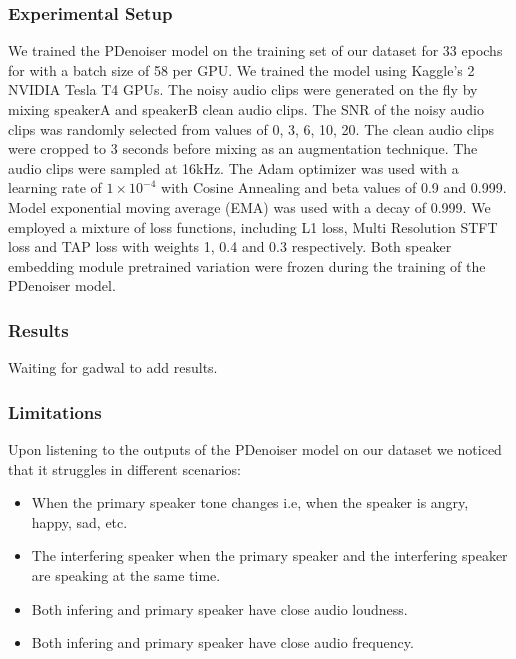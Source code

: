 \subsubsection{Experimental Setup}
We trained the PDenoiser model on the training set of our dataset for 33 epochs for  with a batch size of 58 per GPU. We trained the model using Kaggle's 2 NVIDIA Tesla T4 GPUs.
The noisy audio clips were generated on the fly by mixing speakerA and speakerB clean audio clips. The SNR of the noisy audio clips was randomly selected from values of 0, 3, 6, 10, 20.
The clean audio clips were cropped to 3 seconds before mixing as an augmentation technique. The audio clips were sampled at 16kHz.
The Adam optimizer was used with a learning rate of $1 \times 10^{-4}$ with Cosine Annealing and beta values of 0.9 and 0.999. Model exponential moving average (EMA) was used with a decay of 0.999.
We employed a mixture of loss functions, including L1 loss, Multi Resolution STFT loss and TAP loss with weights 1, 0.4 and 0.3 respectively.
Both speaker embedding module pretrained variation were frozen during the training of the PDenoiser model.

\subsubsection{Results}
Waiting for gadwal to add results.


\subsubsection{Limitations}
Upon listening to the outputs of the PDenoiser model on our dataset we noticed that it struggles in different scenarios:
\begin{itemize}
    \item When the primary speaker tone changes i.e, when the speaker is angry, happy, sad, etc.
    \item The interfering speaker when the primary speaker and the interfering speaker are speaking at the same time.
    \item Both infering and primary speaker have close audio loudness.
    \item Both infering and primary speaker have close audio frequency.
\end{itemize}